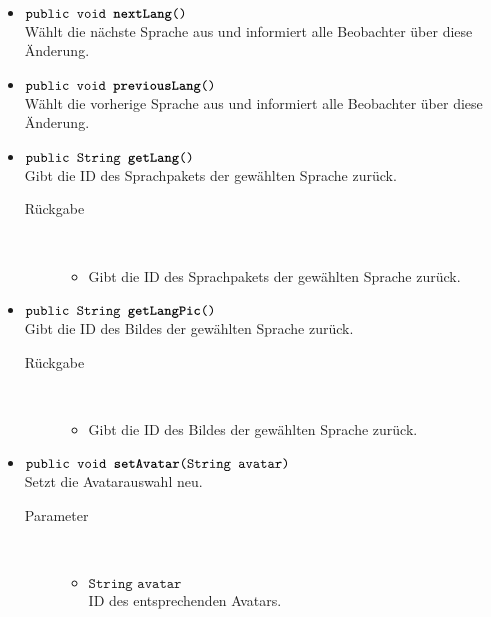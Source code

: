 \begin{description}
\begin{itemize}
		\item $\texttt{public void \textbf{nextLang}()}$ \\ Wählt die nächste Sprache aus und informiert alle Beobachter über diese Änderung.
		
		\item $\texttt{public void \textbf{previousLang}()}$ \\ Wählt die vorherige Sprache aus und informiert alle Beobachter über diese Änderung.
		
		\item $\texttt{public String \textbf{getLang}()}$ \\ Gibt die ID des Sprachpakets der gewählten Sprache zurück.
		\begin{description}
			\item[Rückgabe] \hfill \\
			\vspace{-.8cm}
			\begin{itemize}
				\item Gibt die ID des Sprachpakets der gewählten Sprache zurück.
			\end{itemize}
		\end{description}
		
		\item $\texttt{public String \textbf{getLangPic}()}$ \\ Gibt die ID des Bildes der gewählten Sprache zurück.
		\begin{description}
			\item[Rückgabe] \hfill \\
			\vspace{-.8cm}
			\begin{itemize}
				\item Gibt die ID des Bildes der gewählten Sprache zurück.
			\end{itemize}
		\end{description}
		
		\item $\texttt{public void \textbf{setAvatar}(String avatar)}$ \\ Setzt die Avatarauswahl neu.
		\begin{description}
			\item[Parameter] \hfill \\
			\vspace{-.8cm}
			\begin{itemize}
				\item $\texttt{String avatar}$ \\ ID des entsprechenden Avatars.
			\end{itemize}
		\end{description}
		

\end{itemize}
\end{description}
